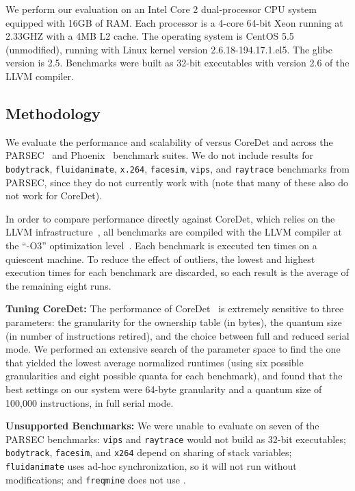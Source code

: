 
We perform our evaluation on an Intel Core 2 dual-processor CPU system
equipped with 16GB of RAM. Each processor is a 4-core 64-bit Xeon
running at 2.33GHZ with a 4MB L2 cache.  The operating system is
CentOS 5.5 (unmodified), running with Linux kernel version
2.6.18-194.17.1.el5. The glibc version is 2.5. Benchmarks were built as 32-bit executables with version
2.6 of the LLVM compiler.

\subsection{Methodology}

We evaluate the performance and scalability of \dthreads{} versus
CoreDet and \pthreads{} across the PARSEC~\cite{parsec} and
Phoenix~\cite{phoenix-hpca} benchmark suites.  We do not include
results for \texttt{bodytrack}, \texttt{fluidanimate}, \texttt{x.264},
\texttt{facesim}, \texttt{vips}, and \texttt{raytrace} benchmarks from PARSEC, 
since they do not currently work with \dthreads{} (note that many of
these also do not work for CoreDet).

In order to compare performance directly against CoreDet, which relies
on the LLVM infrastructure~\cite{LLVM:CGO04}, all benchmarks are
compiled with the LLVM compiler at the ``-O3'' optimization
level~\cite{LLVM:CGO04}. Each benchmark is executed ten
times on a quiescent machine. To reduce the effect of outliers, the
lowest and highest execution times for each benchmark are discarded,
so each result is the average of the remaining eight runs.

\textbf{Tuning CoreDet: } 
The performance of CoreDet~\cite{Bergan:2010:CCR:1736020.1736029} is
extremely sensitive to three parameters: the granularity for the
ownership table (in bytes), the quantum size (in number of
instructions retired), and the choice between full and
reduced serial mode. We performed an extensive search of the parameter
space to find the one that yielded the lowest average normalized
runtimes (using six possible granularities and eight possible quanta for each
benchmark), and found that the best settings on our system were
64-byte granularity and a quantum size of 100,000 instructions, in
full serial mode.

\textbf{Unsupported Benchmarks: }
We were unable to evaluate \dthreads{} on seven of the PARSEC benchmarks: \texttt{vips} and \texttt{raytrace} would not build as 32-bit executables; 
\texttt{bodytrack}, \texttt{facesim}, and \texttt{x264} depend on sharing of stack variables; \texttt{fluidanimate} uses ad-hoc synchronization, so it will not run without modifications; and \texttt{freqmine} does not use \pthreads{}.

